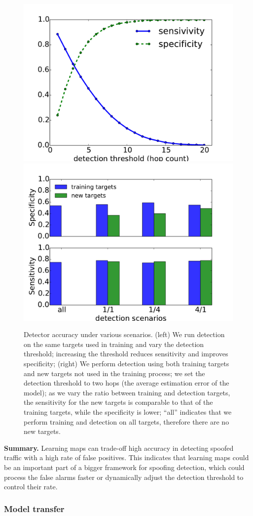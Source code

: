 \begin{figure}[t]
	\centering
	\includegraphics[width=.49\linewidth]{Graph/spoof/sens-spec-accuracy-caida-jun2015-source-to-monitor-ttls-2000files-sample10000.pdf}
	\includegraphics[width=.49\linewidth]{Graph/spoof/accuracy-bars.pdf}
	\caption{Detector accuracy under various scenarios. (left) We run detection on the  same targets used in training and vary the detection threshold; increasing the threshold reduces sensitivity and improves specificity; (right) We perform detection using both training targets and new targets not used in the training process; we set the detection threshold to two hops (the average estimation error of the model); as we vary the ratio between training and detection targets, the sensitivity for the new targets is comparable to that of the training targets, while the specificity is lower; ``all'' indicates that we perform training and detection on all targets, therefore there are no new targets.}
	\label{fig:sens}
	\vspace{0.5cm}
\end{figure}

{\bf Summary.} Learning maps can trade-off high accuracy in detecting spoofed traffic with a high rate of false positives. This indicates that learning maps could be an important part of a bigger framework for spoofing detection, which could process the false alarms faster or dynamically adjust the detection threshold to control their rate.

\subsubsection{Model transfer} 
\label{spoof:transfer}

